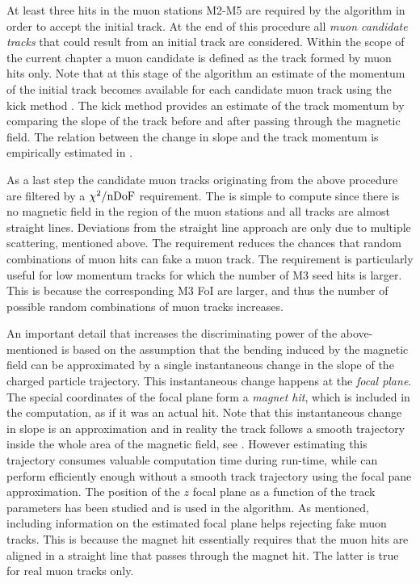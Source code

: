 At least three hits in the muon stations M2-M5 are required by the \mvm algorithm in order to accept the initial \velo track.
At the end of this procedure all {\it muon candidate tracks} that could result from an initial \velo track are considered.
Within the scope of the current chapter a muon candidate is defined as the track formed by muon hits only.
Note that at this stage of the algorithm an estimate of the momentum of the initial \velo track becomes available
for each candidate muon track using the kick method \cite{Hommels:999327}. The kick method provides an estimate
of the track momentum by comparing the slope of the track before and after passing through the \lhcb magnetic
field. The relation between the change in slope and the track momentum is empirically estimated in \cite{roelThesis}.

As a last step the candidate muon tracks originating from the above procedure are filtered by a $\chi^2/\rm nDoF$
requirement. The \chisq is simple to compute since there is no magnetic field in the region of the muon stations
and all tracks are almost straight lines. Deviations from the straight line approach are only due to
multiple scattering, mentioned above. The \chisq requirement reduces the chances that random combinations of muon hits
can fake a muon track. The requirement is particularly useful for low momentum tracks for which the number
of M3 seed hits is larger. This is because the corresponding M3 FoI are larger, and thus the number of possible
random combinations of muon tracks increases.

An important detail that increases the discriminating power of the above-mentioned \chisq is based on the
assumption that the bending induced by the \lhcb magnetic field can be approximated by a single instantaneous
change in the slope of the charged particle trajectory. This instantaneous change happens at the {\it focal plane}.
The special coordinates of the focal plane form a {\it magnet hit}, which is included in
the \chisq computation, as if it was an actual hit. Note that this instantaneous change in slope is an approximation
and in reality the track follows a smooth trajectory inside the whole area of the magnetic field, see .
However estimating this trajectory consumes valuable computation time during \hltone run-time, while \mvm can perform
efficiently enough without a smooth track trajectory using the focal
pane approximation. The position of the $z$ focal plane as a function of the track parameters has been studied
\cite{Hommels:999327} and is used in the \mvm algorithm. As mentioned, including information on the estimated
focal plane helps rejecting fake muon tracks. This is because the magnet hit essentially requires that the
muon hits are aligned in a straight line that passes through the magnet hit. The latter is true for real muon tracks only.

